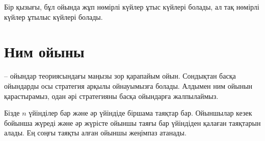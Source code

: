 
\begin{center}
\end{center}

Бір қызығы, бұл ойында жұп нөмірлі күйлер ұтыс күйлері болады, ал
тақ нөмірлі күйлер ұтылыс күйлері болады.


\section{Ним ойыны}


 -- ойындар теориясындағы маңызы 
зор қарапайым ойын. Сондықтан басқа ойындарды осы стратегия
арқылы ойнауымызға болады. Алдымен ним ойынын қарастырамыз,
одан әрі стратегияны басқа ойындарға жалпылаймыз. 


Бізде $n$ үйінділер бар және әр үйіндіде 
біршама таяқтар бар. Ойыншылар кезек бойынша
жүреді және әр жүрісте ойыншы таяғы бар үйіндіден 
қалаған таяқтарын алады. Ең соңғы таяқты алған 
ойыншы жеңімпаз атанады. 


